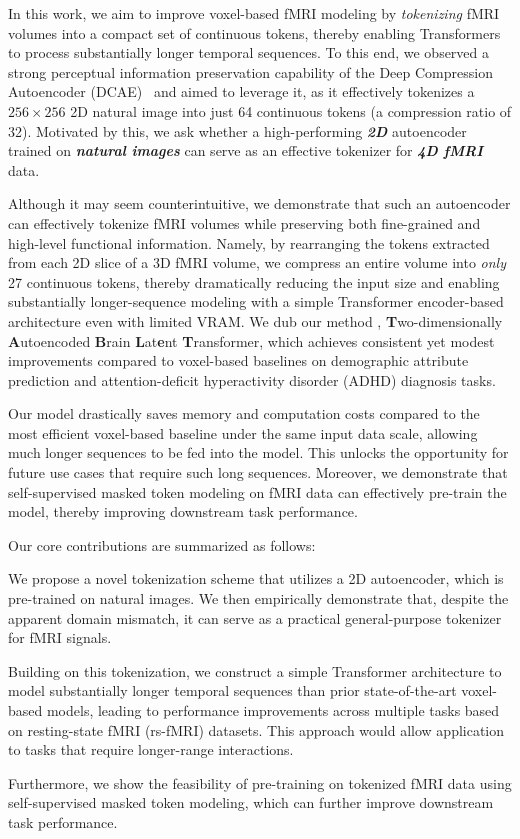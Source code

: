 In this work, we aim to improve voxel-based fMRI modeling by \emph{tokenizing} fMRI volumes into a compact set of continuous tokens, thereby enabling Transformers \citep{attention} to process substantially longer temporal sequences. 
To this end, we observed a strong perceptual information preservation capability of the Deep Compression Autoencoder (DCAE)~\citep{DCAE} and aimed to leverage it, as it effectively tokenizes a \(256 \times 256\) 2D natural image into just 64 continuous tokens (a compression ratio of 32). 
Motivated by this, we ask whether a high-performing \textit{\textbf{2D}} autoencoder trained on \textit{\textbf{natural images}} can serve as an effective tokenizer for \textit{\textbf{4D fMRI}} data. 

Although it may seem counterintuitive, we demonstrate that such an autoencoder can effectively tokenize fMRI volumes while preserving both fine-grained and high-level functional information.
Namely, by rearranging the tokens extracted from each 2D slice of a 3D fMRI volume, we compress an entire volume into \textit{only} 27 continuous tokens, thereby dramatically reducing the input size and enabling substantially longer-sequence modeling with a simple Transformer encoder-based architecture even with limited VRAM. We dub our method {\ours}, \textbf{T}wo-dimensionally \textbf{A}utoencoded \textbf{B}rain \textbf{L}at\textbf{e}nt \textbf{T}ransformer, which achieves consistent yet modest improvements compared to voxel-based baselines on demographic attribute prediction and attention-deficit hyperactivity disorder (ADHD) diagnosis tasks. 

Our model drastically saves memory and computation costs compared to the most efficient voxel-based baseline under the same input data scale, allowing much longer sequences to be fed into the model. This unlocks the opportunity for future use cases that require such long sequences.
Moreover, we demonstrate that self-supervised masked token modeling on fMRI data can effectively pre-train the model, thereby improving downstream task performance.


Our core contributions are summarized as follows:

\begin{compactitem}
\item We propose a novel tokenization scheme that utilizes a 2D autoencoder, which is pre-trained on natural images. We then empirically demonstrate that, despite the apparent domain mismatch, it can serve as a practical general-purpose tokenizer for fMRI signals.
\item Building on this tokenization, we construct a simple Transformer architecture to model substantially longer temporal sequences than prior state-of-the-art voxel-based models, leading to performance improvements across multiple tasks based on resting-state fMRI (rs-fMRI) datasets. This approach would allow application to tasks that require longer-range interactions.
\item Furthermore, we show the feasibility of pre-training on tokenized fMRI data using self-supervised masked token modeling, which can further improve downstream task performance.
\end{compactitem}



